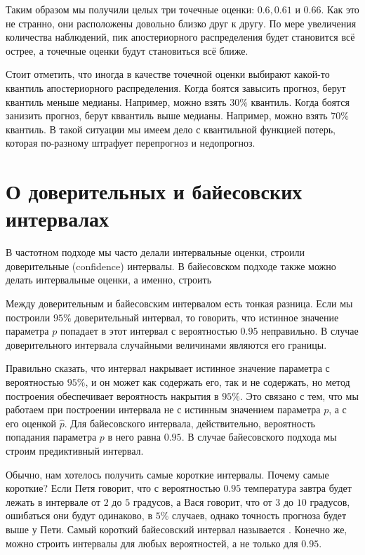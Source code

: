 \documentclass[12pt, a4paper, oneside]{article}
\begin{document}
Таким образом мы получили целых три точечные оценки: $0.6, 0.61$ и $0.66$. Как это не странно, они расположены довольно близко друг к другу. По мере увеличения количества наблюдений, пик апостериорного распределения будет становится всё острее, а точечные оценки будут становиться всё ближе.

Стоит отметить, что иногда в качестве точечной оценки выбирают какой-то квантиль апостериорного распределения. Когда боятся завысить прогноз, берут квантиль меньше медианы. Например, можно взять $30\%$ квантиль. Когда боятся занизить прогноз, берут кввантиль выше медианы. Например, можно взять $70\%$ квантиль. В такой ситуации мы имеем дело с квантильной функцией потерь, которая по-разному штрафует перепрогноз и недопрогноз. 


\section*{О доверительных и байесовских интервалах}

В частотном подходе мы часто делали интервальные оценки, строили доверительные (confidence) интервалы. В байесовском подходе также можно делать интервальные оценки, а именно, строить 

Между доверительным и байесовским интервалом есть тонкая разница. Если мы построили $95\%$ доверительный интервал, то говорить, что истинное значение параметра $p$ попадает в этот интервал с вероятностью $0.95$ неправильно. В случае доверительного интервала случайными величинами являются его границы.

Правильно сказать, что интервал накрывает истинное значение параметра с вероятностью $95\%$, и он может как содержать его, так и не содержать, но метод построения обеспечивает вероятность накрытия в $95\%.$ Это связано с тем, что мы работаем при построении интервала не с истинным значением параметра $p$, а с его оценкой $\hat p$. Для байесовского интервала, действительно, вероятность попадания параметра $p$ в него равна $0.95$. В случае байесовского подхода мы строим предиктивный интервал. 

Обычно, нам хотелось получить самые короткие интервалы. Почему самые короткие? Если Петя говорит, что с вероятностью $0.95$ температура завтра будет лежать в интервале от $2$ до $5$ градусов, а Вася говорит, что от $3$ до $10$ градусов, ошибаться они будут одинаково, в $5\%$ случаев, однако точность прогноза будет выше у Пети. Самый короткий байесовский интервал называется . Конечно же, можно строить интервалы для любых вероятностей, а не только для $0.95$.
\end{document}
